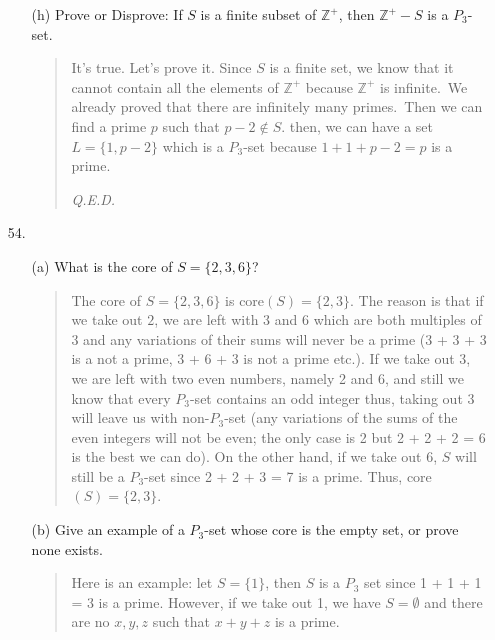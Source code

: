 \documentclass[12pt, a4paper]{article}                      %
\begin{document}
\begin{itemize}
\begin{itemize}
\item[]

\item[(h)]
Prove or Disprove: If $S$ is a finite subset of $\mathbb{Z}^+$, then $\mathbb{Z}^+ - S$ is a $P_3$-set.
\begin{quote}
It's true. Let's prove it. Since $S$ is a finite set, we know that it cannot contain all the elements of $\mathbb{Z}^+$ because $\mathbb{Z}^+$ is infinite.\ We already proved that there are infinitely many primes.\ Then we can find a prime $p$ such that $p - 2 \notin S$.
then, we can have a set $L = \{1, p - 2\}$ which is a $P_3$-set because $1 + 1 + p - 2 = p$ is a prime.
\begin{flushright}
\textit{Q.E.D.}
\end{flushright}
\end{quote}
\end{itemize}

\item[]
\item[]

\item[54.]
\begin{itemize}
If a subset $S$ of $\mathbb{Z}^+$ is a $P_3$-set then the \textbf{core} of $S$ is the set
$$\mbox{core}(S) := \{s \in S \mid S - \{s\} \mbox{ is not a $P_3$-set}\}.$$

\item[]

\item[(a)]
What is the core of $S = \{2, 3, 6\}$?
\begin{quote}
The core of $S = \{2, 3, 6\}$ is core$(S) = \{2, 3\}$.
The reason is that if we take out $2$, we are left with 3 and 6 which are both multiples of 3 and any variations of their sums will never be a prime (3 + 3 + 3 is a not a prime, 3 + 6 + 3 is not a prime etc.).
If we take out 3, we are left with two even numbers, namely 2 and 6, and still we know that every $P_3$-set contains an odd integer thus, taking out 3 will leave us with non-$P_3$-set (any variations of the sums of the even integers will not be even; the only case is 2 but 2 + 2 + 2 = 6 is the best we can do). On the other hand, if we take out 6, $S$ will still be a $P_3$-set since 2 + 2 + 3 = 7 is a prime.
Thus, core$(S) = \{2, 3\}$.
\end{quote}

\item[]

\item[(b)]
Give an example of a $P_3$-set whose core is the empty set, or prove none exists.
\begin{quote}
Here is an example: let $S = \{1\}$, then $S$ is a $P_3$ set since 1 + 1 + 1 = 3 is a prime. However, if we take out 1, we have $S = \emptyset$
and there are no $x, y, z$ such that $x + y + z$ is a prime.
\end{quote}


\end{itemize}
\end{itemize}
\end{document}
